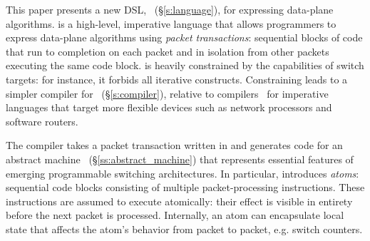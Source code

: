 



This paper presents a new DSL, \pktlanguage~(\S\ref{s:language}), for
expressing data-plane algorithms. \pktlanguage is a high-level, imperative
language that allows programmers to express data-plane algorithms using {\em
packet transactions}: sequential blocks of code that run to completion on each
packet and in isolation from other packets executing the same code block.
\pktlanguage is heavily constrained by the capabilities of switch targets: for
instance, it forbids all iterative constructs. Constraining \pktlanguage leads
to a simpler compiler for \pktlanguage~(\S\ref{s:compiler}), relative to
compilers~\cite{ixp} for imperative languages that target more flexible devices
such as network processors and software routers.

The \pktlanguage compiler takes a packet transaction written in \pktlanguage
and generates code for an abstract machine
\absmachine~(\S\ref{ss:abstract_machine}) that represents essential
features of emerging programmable switching architectures.  In particular,
\absmachine introduces \textit{atoms}: sequential code blocks consisting of
multiple packet-processing instructions. These instructions are assumed to
execute atomically: their effect is visible in entirety before the next packet
is processed. Internally, an atom can encapsulate local state that affects the
atom's behavior from packet to packet, e.g.  switch counters.

